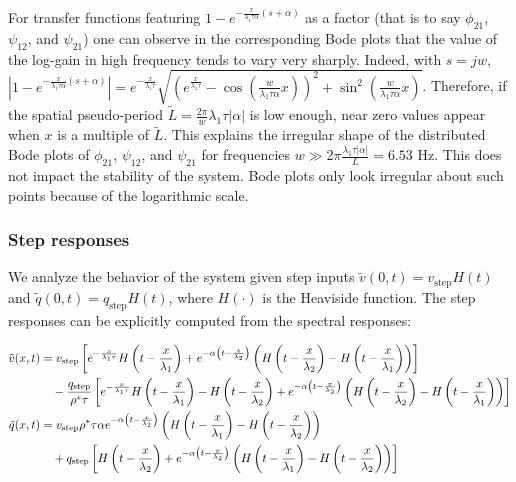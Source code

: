 \documentclass[preprint]{elsarticle}
\begin{document}
For transfer functions featuring $1 - e^{-\frac{x}{\lambda_{1} \tau \alpha} \left(s + \alpha \right)}$ as a factor (that is to say $\phi_{21}$, $\psi_{12}$, and $\psi_{21}$) one can observe in the corresponding Bode plots that the value of the log-gain in high frequency tends to vary very sharply. Indeed, with $s = jw$,
$
\left| 
	1 - e^{-\frac{x}{\lambda_{1} \tau \alpha} \left(s + \alpha\right)}
\right| = 
e^{-\frac{x}{\lambda_{1} \tau}}
\sqrt{
	\left(
		e^{\frac{x}{\lambda_{1}\tau}} 
		-
		\cos\left(\frac{w}{\lambda_{1} \tau \alpha} x\right)
	\right)^{2}
	+
	\sin^{2}\left( \frac{w}{\lambda_{1} \tau \alpha} x \right)
}
$. Therefore, if the spatial pseudo-period $\tilde{L}=\frac{2\pi}{w} \lambda_{1} \tau \left|\alpha\right|$ is low enough, near zero values appear when $x$ is a multiple of $\tilde{L}$. This explains the irregular shape of the distributed Bode plots of $\phi_{21}$, $\psi_{12}$, and $\psi_{21}$ for frequencies $w \gg 2 \pi \frac{\lambda_{1} \tau \left|\alpha\right|}{L} = 6.53$ Hz. This does not impact the stability of the system. Bode plots only look irregular about such points because of the logarithmic scale.

\subsubsection{Step responses}
We analyze the behavior of the system given step inputs $\tilde{v}(0,t)=v_{\text{step}}H(t)$ and $\tilde{q}(0,t)=q_{\text{step}}H(t)$, where $H(\cdot)$ is the Heaviside function. The step responses can be explicitly computed from the spectral responses:

\begin{align} 
\tilde{v}(x,t) &= v_{\text{step}}
\left[
	e^{-\frac{x}{\lambda_{1}\tau}} H\left(t-\frac{x}{\lambda_{1}}\right)
	+
	e^{-\alpha \left(t - \frac{x}{\lambda_{2}} \right)}
	\left(
		H\left(t - \frac{x}{\lambda_{2}} \right) - H\left(t - \frac{x}{\lambda_{1}} \right)
	\right)
\right]
\notag \\
&\quad
- \dfrac{q_{\text{step}}}{\rho^* \tau}
\left[
	e^{-\frac{x}{\lambda_{1}\tau}} H\left(t-\frac{x}{\lambda_{1}}\right) - H\left(t - \frac{x}{\lambda_{2}} \right) +
	e^{-\alpha \left(t - \frac{x}{\lambda_{2}} \right)}
	\left(
		H\left(t - \frac{x}{\lambda_{2}} \right) - H\left(t - \frac{x}{\lambda_{1}} 	\right)
	\right)
\right] \\
	\tilde{q}(x,t) &= v_{\text{step}} \rho^*\tau \alpha e^{-\alpha \left(t - \frac{x}{\lambda_{2}} \right)}
		\left(
		H\left(t - \frac{x}{\lambda_{1}} \right) - H\left(t - \frac{x}{\lambda_{2}} 	\right)
	\right)
\notag \\
&\quad+ 
q_{\text{step}}
\left[
H\left(t - \frac{x}{\lambda_{2}} \right) + e^{-\alpha \left(t - \frac{x}{\lambda_{2}} \right)}
		\left(
		H\left(t - \frac{x}{\lambda_{1}} \right) - H\left(t - \frac{x}{\lambda_{2}} 	\right)
	\right)
\right]
\end{align}
\end{document}
